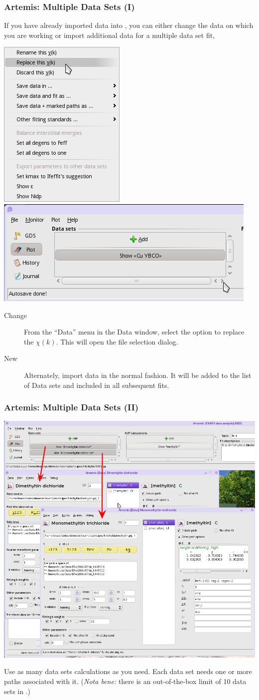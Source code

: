 \documentclass[10pt, xcolor=x11names, compress]{beamer}
\begin{document}
\begin{frame}
  \frametitle{Artemis: Multiple Data Sets (I)}

  If you have already imported data into {\artemis}, you can either
  change the data on which you are working or import additional data
  for a multiple data set fit,

  \begin{center}
    \includegraphics[width=0.2\linewidth]{artemis/change_data.png}\qquad
    \includegraphics[width=0.4\linewidth]{artemis/data_import.png}
  \end{center}

  \begin{description}
  \item[Change] From the ``Data'' menu in the Data window, select the
    option to replace the $\chi(k)$.  This will open the file
    selection dialog.
  \item[New] Alternately, import data in the normal fashion.  It will
    be added to the list of Data sets and included in all subsequent
    fits.
  \end{description}
\end{frame}

\begin{frame}
  \frametitle{Artemis: Multiple Data Sets (II)}

  \begin{center}
    \includegraphics[width=0.6\linewidth]{artemis/mds.png}

    Use as many data sets calculations as you need.  Each data set
    needs one or more paths associated with it.  (\textit{Nota bene:}
    there is an out-of-the-box limit of 10 data sets in {\artemis}.)
  \end{center}
\end{frame}
\end{document}
